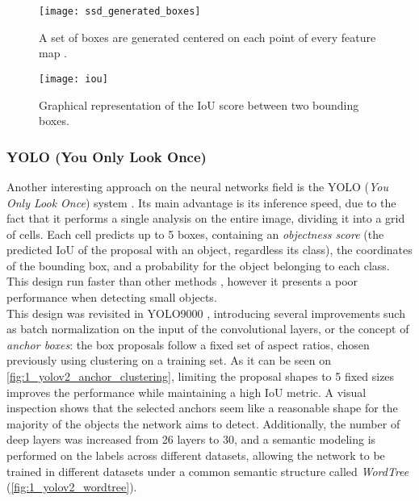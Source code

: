 \vspace{8cm}
\begin{figure}[h]
	\centering
	\texttt{[image: ssd\_generated\_boxes]}
	\caption{A set of boxes are generated centered on each point of every feature map \cite{ssd}.}
	\label{fig:1_ssd_generated_boxes}
\end{figure}

\begin{figure}[h]
	\centering
	\texttt{[image: iou]}
	\caption{Graphical representation of the IoU score between two bounding boxes.}
	\label{fig:1_iou}
\end{figure}

\subsubsection{YOLO (You Only Look Once)}

Another interesting approach on the neural networks field is the YOLO (\textit{You Only Look Once}) system \cite{yolov1}. Its main advantage is its inference speed, due to the fact that it performs a single analysis on the entire image, dividing it into a grid of cells. Each cell predicts up to 5 boxes, containing an \textit{objectness score} (the predicted IoU of the proposal with an object, regardless its class), the coordinates of the bounding box, and a probability for the object belonging to each class. This design run faster than other methods \cite{yolov1}, however it presents a poor performance when detecting small objects.\\

This design was revisited in YOLO9000 \cite{yolov2}, introducing several improvements such as batch normalization on the input of the convolutional layers, or the concept of \textit{anchor boxes}: the box proposals follow a fixed set of aspect ratios, chosen previously using clustering on a training set. As it can be seen on \autoref{fig:1_yolov2_anchor_clustering}, limiting the proposal shapes to 5 fixed sizes improves the performance while maintaining a high IoU metric. A visual inspection shows that the selected anchors seem like a reasonable shape for the majority of the objects the network aims to detect. Additionally, the number of deep layers was increased from 26 layers to 30, and a semantic modeling is performed on the labels across different datasets, allowing the network to be trained in different datasets under a common semantic structure called \textit{WordTree} (\autoref{fig:1_yolov2_wordtree}).

